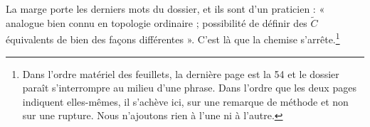 \documentclass[11pt,a4paper]{article}
\begin{document}
La marge porte les derniers mots du dossier, et ils sont d'un praticien :
« analogue bien connu en topologie ordinaire ; possibilité de définir des
$\widetilde{C}$ équivalents de bien des façons différentes ». C'est là que la
chemise s'arrête.\footnote{Dans l'ordre matériel des feuillets, la dernière
page est la 54 et le dossier paraît s'interrompre au milieu d'une phrase. Dans
l'ordre que les deux pages indiquent elles-mêmes, il s'achève ici, sur une
remarque de méthode et non sur une rupture. Nous n'ajoutons rien à l'une ni à
l'autre.}
\end{document}
